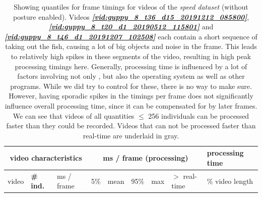 \documentclass[9pt,lineno]{elife}
\newcommand{\vidref}[1]{\textit{\textbf{\ref{#1}}}}
\newcommand{\TRex}{\protect\path{TRex}}
\begin{document}
\begin{table}
\caption{Showing quantiles for frame timings for videos of the \textit{speed dataset} (without posture enabled). Videos \vidref{vid:guppy_8_t36_d15_20191212_085800}, \vidref{vid:guppy_8_t20_d1_20190512_115801} and \vidref{vid:guppy_8_t46_d1_20191207_102508} each contain a short sequence of taking out the fish, causing a lot of big objects and noise in the frame. This leads to relatively high spikes in these segments of the video, resulting in high peak processing timings here. Generally, processing time is influenced by a lot of factors involving not only \TRex{}, but also the operating system as well as other programs. While we did try to control for these, there is no way to make sure. However, having sporadic spikes in the timings per frame does not significantly influence overall processing time, since it can be compensated for by later frames. We can see that videos of all quantities $\leq$ 256 individuals can be processed faster than they could be recorded. Videos that can not be processed faster than real-time are underlaid in gray.}\label{tab:absolute_speeds_no_posture}
\begin{tabular}{l l l | l l l l l | l}
\toprule
\multicolumn{3}{c|}{video characteristics} & \multicolumn{5}{c|}{ms / frame (processing)} & processing time \\
\midrule
video & \textbf{{\# ind.}}  & ms / frame & 5\% & mean & 95\% & max & $>$ real-time & \% video length  \\
\midrule


\end{tabular}
\end{table}
\end{document}

